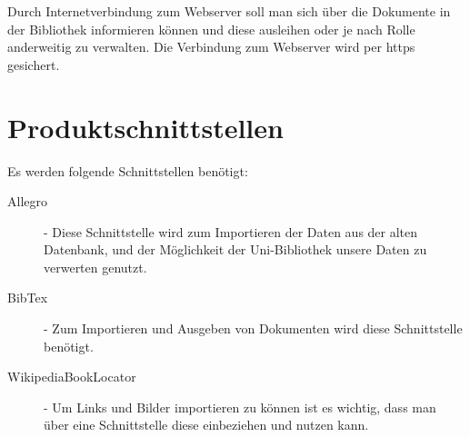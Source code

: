 Durch Internetverbindung zum Webserver soll man sich über die Dokumente in der Bibliothek informieren können und 
diese ausleihen oder je nach Rolle anderweitig zu verwalten. Die Verbindung zum Webserver wird per https gesichert. 



\section{Produktschnittstellen}


Es werden folgende Schnittstellen benötigt: 
\begin{description}
\item [Allegro] - Diese Schnittstelle wird zum Importieren der Daten aus der alten Datenbank, und der Möglichkeit der Uni-Bibliothek unsere Daten zu verwerten genutzt.
\item [BibTex] - Zum Importieren und Ausgeben von Dokumenten wird diese Schnittstelle benötigt. 
\item [WikipediaBookLocator] - Um Links und Bilder importieren zu können ist es wichtig, dass man über eine Schnittstelle diese einbeziehen und nutzen kann.
\end{description}


